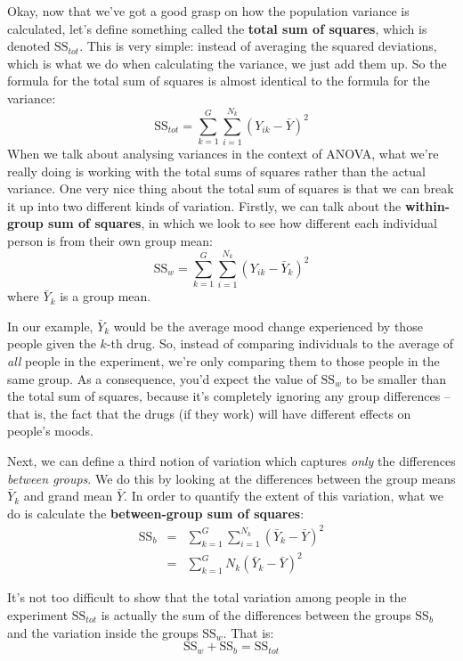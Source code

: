 \documentclass[
  11pt,
  a4paper,
  twoside,symmetric,openright]{book}
\theoremstyle{break}
\theoremstyle{break}
\begin{document}
Okay, now that we've got a good grasp on how the population variance is calculated, let's define something called the \textbf{total sum of squares}, which is denoted \(\mbox{SS}_{tot}\). This is very simple: instead of averaging the squared deviations, which is what we do when calculating the variance, we just add them up. So the formula for the total sum of squares is almost identical to the formula for the variance:
\[
\mbox{SS}_{tot} = \sum_{k=1}^G \sum_{i=1}^{N_k} \left(Y_{ik} - \bar{Y} \right)^2
\]
When we talk about analysing variances in the context of ANOVA, what we're really doing is working with the total sums of squares rather than the actual variance. One very nice thing about the total sum of squares is that we can break it up into two different kinds of variation. Firstly, we can talk about the \textbf{within-group sum of squares}, in which we look to see how different each individual person is from their own group mean:
\[
\mbox{SS}_w = \sum_{k=1}^G \sum_{i=1}^{N_k} \left( Y_{ik} - \bar{Y}_k \right)^2
\]
where \(\bar{Y}_k\) is a group mean.

In our example, \(\bar{Y}_k\) would be the average mood change experienced by those people given the \(k\)-th drug. So, instead of comparing individuals to the average of \emph{all} people in the experiment, we're only comparing them to those people in the same group. As a consequence, you'd expect the value of \(\mbox{SS}_w\) to be smaller than the total sum of squares, because it's completely ignoring any group differences -- that is, the fact that the drugs (if they work) will have different effects on people's moods.

Next, we can define a third notion of variation which captures \emph{only} the differences \emph{between groups}. We do this by looking at the differences between the group means \(\bar{Y}_k\) and grand mean \(\bar{Y}\). In order to quantify the extent of this variation, what we do is calculate the \textbf{between-group sum of squares}:
\[
\begin{array}{rcl}
\mbox{SS}_{b} &=& \sum_{k=1}^G \sum_{i=1}^{N_k} \left( \bar{Y}_k - \bar{Y} \right)^2
 \\
&=& \sum_{k=1}^G N_k \left( \bar{Y}_k - \bar{Y} \right)^2
\end{array}
\]

It's not too difficult to show that the total variation among people in the experiment \(\mbox{SS}_{tot}\) is actually the sum of the differences between the groups \(\mbox{SS}_b\) and the variation inside the groups \(\mbox{SS}_w\). That is:
\[
\mbox{SS}_w  + \mbox{SS}_{b} = \mbox{SS}_{tot}
\]
\end{document}
